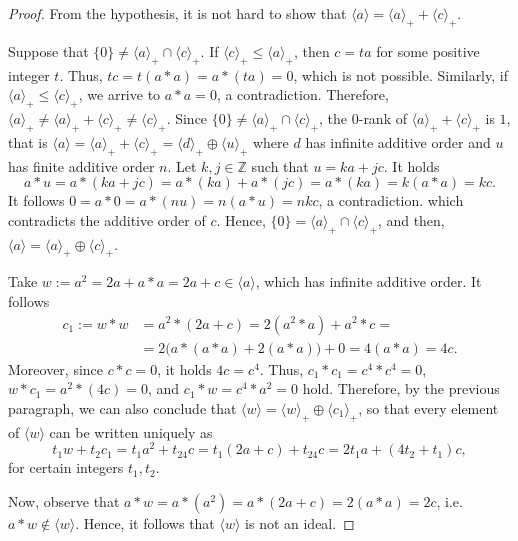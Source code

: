 \documentclass[12pt, a4paper, english]{article}
\theoremstyle{definition}
\begin{document}
\begin{proof} 
From the hypothesis, it is not hard to show that $\langle a \rangle = \langle a \rangle_+ + \langle c \rangle_+$. 

Suppose that  $\{0\} \neq \langle a \rangle_+ \cap \langle c \rangle_+$. If $\langle c \rangle_+ \leq \langle a \rangle_+$, then $c = ta$ for some positive integer $t$. Thus, $tc = t(a \ast a) = a \ast (ta) = 0$, which is not possible. Similarly, if $\langle a \rangle_+ \leq \langle c \rangle_+$, we arrive to $a \ast a = 0$, a contradiction. Therefore, $\langle a \rangle_+ \neq \langle a \rangle_+ + \langle c \rangle_+ \neq \langle c \rangle_+$. Since $\{0\} \neq \langle a \rangle_+ \cap \langle c \rangle_+$, the $0$-rank of $\langle a \rangle_+ + \langle c \rangle_+$ is $1$, that is $ \langle a \rangle = \langle a \rangle_+ + \langle c \rangle_+ = \langle d \rangle_+ \oplus \langle u \rangle_+$ where $d$ has infinite additive order and $u$ has finite additive order $n$. Let $k, j \in \mathbb{Z}$ such that  $u = ka + jc$. It holds
\[ a \ast u = a \ast (ka+jc) = a \ast (ka) + a \ast (jc) = a \ast (ka) = k(a\ast a) = kc.\]
It follows $0 = a \ast 0 = a \ast(nu) = n(a\ast u) = nkc$, a contradiction. 
which contradicts the additive order of $c$. Hence, $\{0\} = \langle a \rangle_+ \cap \langle c \rangle_+$, and then, $\langle a \rangle = \langle a \rangle_+ \oplus \langle c \rangle_+$. 

Take $w := a^2 = 2a + a \ast a = 2a + c \in \langle a \rangle$, which has infinite additive order. It follows
\begin{align*}
c_1:= w\ast w & = a^2 \ast (2a + c) = 2(a^2 \ast a) + a^2 \ast c =\\
& = 2\big(a \ast (a \ast a) + 2(a \ast a)\big) + 0  =  4(a \ast a) = 4c.
\end{align*}
Moreover, since $c\ast c = 0$, it holds $4c = c^4$. Thus,  $c_1 \ast c_1 = c^4 \ast c^4 = 0$, $w\ast c_1 = a^2 \ast (4c) = 0$, and $c_1 \ast w = c^4\ast a^2 = 0$ hold. Therefore, by the previous paragraph, we can also conclude that $\langle w \rangle = \langle w \rangle_+ \oplus \langle c_1 \rangle_+$, so that every element of $\langle w\rangle$ can be written uniquely as 
\[ t_1w + t_2c_1 = t_1a^2 + t_24c = t_1(2a + c) + t_24c = 2t_1a + (4t_2 + t_1)c,\]
for certain integers $t_1, t_2$. 

Now, observe that $a\ast w = a \ast (a^2) = a \ast (2a + c) = 2(a \ast a) = 2c$, i.e.  $a\ast w \notin\langle w \rangle$. Hence, it follows that $\langle w \rangle$ is not an ideal. 
\end{proof}
\end{document}
